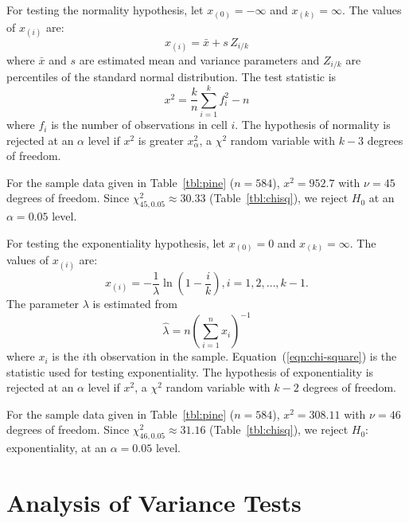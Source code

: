 \documentclass[draft]{article}
\newenvironment{example}{%
   \vspace{\baselineskip}
   \par\noindent\hrulefill\par
   \noindent{\em Example:}}{%
   \par\noindent\hrulefill\par
   \vspace{\baselineskip}}
\begin{document}
For testing the normality hypothesis,
let \(x_{\left(0\right)}=-\infty\) and
\(x_{\left(k\right)}=\infty\).
The values of \(x_{\left(i\right)}\) are:
\begin{equation}
x_{\left(i\right)} = \bar{x} + s\,Z_{i/k}
\end{equation}
where \(\bar{x}\) and \(s\) are estimated
mean and variance parameters and \(Z_{i/k}\)
are percentiles of the standard normal distribution.
The test statistic is
\begin{equation}
\label{eqn:chi-square}
x^2 = \frac{k}{n}\sum_{i=1}^k f_i^2-n
\end{equation}
where \(f_i\) is the number of observations in cell \(i\).
The hypothesis of normality is rejected at an \(\alpha\)
level if \(x^2\) is greater \(x^2_{\alpha}\), a
\(\chi^2\) random variable with \(k-3\) degrees of freedom.

\begin{example}
For the sample data given in Table~\ref{tbl:pine} (\(n=584\)),
\(x^2 = 952.7\) with \(\nu=45\) degrees of freedom.
Since \(\chi^2_{45,0.05}\approx30.33\) (Table~\ref{tbl:chisq}),
we reject \(H_0\) at an \(\alpha=0.05\) level.
\end{example}

For testing the exponentiality hypothesis,
let \(x_{\left(0\right)}=0\) and
\(x_{\left(k\right)}=\infty\).
The values of \(x_{\left(i\right)}\) are:
\begin{equation}
x_{\left(i\right)} = -\frac{1}{\lambda}\ln\left(1-\frac{i}{k}\right),
i=1,2,\ldots,k-1.
\end{equation}
The parameter \(\lambda\) is estimated from
\begin{equation}
\hat{\lambda} = n \left(\sum_{i=1}^n x_i\right)^{-1}
\end{equation}
where \(x_i\) is the \(i\)th observation in
the sample.  Equation~(\ref{eqn:chi-square})
is the statistic used for testing exponentiality. The hypothesis
of exponentiality is rejected at an \(\alpha\) level if
\(x^2\), a \(\chi^2\) random variable with \(k-2\)
degrees of freedom.

\begin{example}
For the sample data given in Table~\ref{tbl:pine} (\(n=584\)),
\(x^2 = 308.11\) with \(\nu=46\) degrees of freedom.
Since \(\chi^2_{46,0.05}\approx31.16\) (Table~\ref{tbl:chisq}),
we reject \(H_0:\) exponentiality, at an \(\alpha=0.05\) level.
\end{example}

\section{Analysis of Variance Tests}
\end{document}
